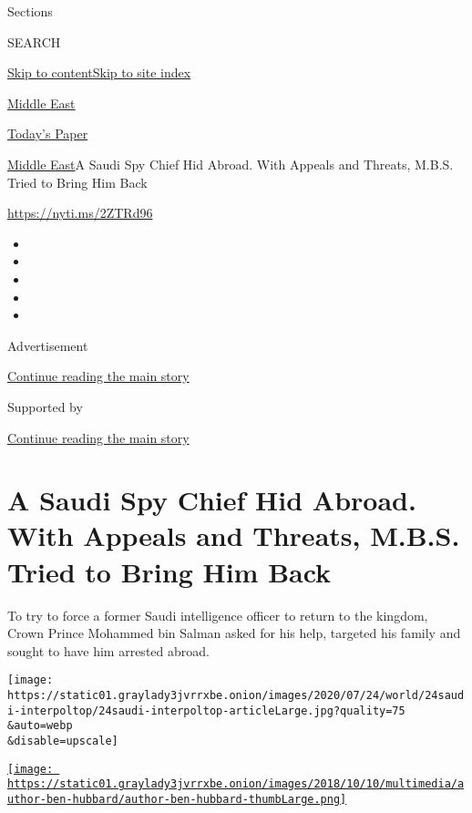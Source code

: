 Sections

SEARCH

\protect\hyperlink{site-content}{Skip to
content}\protect\hyperlink{site-index}{Skip to site index}

\href{https://www.nytimes3xbfgragh.onion/section/world/middleeast}{Middle
East}

\href{https://myaccount.nytimes3xbfgragh.onion/auth/login?response_type=cookie\&client_id=vi}{}

\href{https://www.nytimes3xbfgragh.onion/section/todayspaper}{Today's
Paper}

\href{/section/world/middleeast}{Middle East}\textbar{}A Saudi Spy Chief
Hid Abroad. With Appeals and Threats, M.B.S. Tried to Bring Him Back

\url{https://nyti.ms/2ZTRd96}

\begin{itemize}
\item
\item
\item
\item
\item
\end{itemize}

Advertisement

\protect\hyperlink{after-top}{Continue reading the main story}

Supported by

\protect\hyperlink{after-sponsor}{Continue reading the main story}

\hypertarget{a-saudi-spy-chief-hid-abroad-with-appeals-and-threats-mbs-tried-to-bring-him-back}{%
\section{A Saudi Spy Chief Hid Abroad. With Appeals and Threats, M.B.S.
Tried to Bring Him
Back}\label{a-saudi-spy-chief-hid-abroad-with-appeals-and-threats-mbs-tried-to-bring-him-back}}

To try to force a former Saudi intelligence officer to return to the
kingdom, Crown Prince Mohammed bin Salman asked for his help, targeted
his family and sought to have him arrested abroad.

\texttt{[image: https://static01.graylady3jvrrxbe.onion/images/2020/07/24/world/24saudi-interpoltop/24saudi-interpoltop-articleLarge.jpg?quality=75\\\&auto=webp\\\&disable=upscale]}

\href{https://www.nytimes3xbfgragh.onion/by/ben-hubbard}{\texttt{[image: https://static01.graylady3jvrrxbe.onion/images/2018/10/10/multimedia/author-ben-hubbard/author-ben-hubbard-thumbLarge.png]}}

